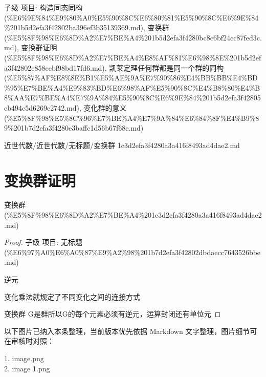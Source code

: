 \begin{note}[变换群]

子级 项目: 构造同态同构 (\%E6\%9E\%84\%E9\%80\%A0\%E5\%90\%8C\%E6\%80\%81\%E5\%90\%8C\%E6\%9E\%84\%201b5d2efa3f42802ba396ef3b35139369.md), 变换群 (\%E5\%8F\%98\%E6\%8D\%A2\%E7\%BE\%A4\%201b5d2efa3f4280bc8c6bf24cc87fed3c.md), 变换群证明 (\%E5\%8F\%98\%E6\%8D\%A2\%E7\%BE\%A4\%E8\%AF\%81\%E6\%98\%8E\%201b5d2efa3f42802e858cebf98bd17fd6.md), 凯莱定理任何群都是同一个群的同构 (\%E5\%87\%AF\%E8\%8E\%B1\%E5\%AE\%9A\%E7\%90\%86\%E4\%BB\%BB\%E4\%BD\%95\%E7\%BE\%A4\%E9\%83\%BD\%E6\%98\%AF\%E5\%90\%8C\%E4\%B8\%80\%E4\%B8\%AA\%E7\%BE\%A4\%E7\%9A\%84\%E5\%90\%8C\%E6\%9E\%84\%201b5d2efa3f42805cb494c5d6269c2742.md), 变化群的意义 (\%E5\%8F\%98\%E5\%8C\%96\%E7\%BE\%A4\%E7\%9A\%84\%E6\%84\%8F\%E4\%B9\%89\%201b7d2efa3f4280e3baffc1d56b67f68e.md)

\end{note}

\begin{note}[来源路径]

近世代数/近世代数/无标题/变换群 1c3d2efa3f4280a3a416f8493ad4dae2.md

\end{note}

\section*{变换群证明}

\begin{note}[来源上级主题]

变换群 (\%E5\%8F\%98\%E6\%8D\%A2\%E7\%BE\%A4\%201c3d2efa3f4280a3a416f8493ad4dae2.md)

\end{note}

\begin{proof}

子级 项目: 无标题 (\%E6\%97\%A0\%E6\%A0\%87\%E9\%A2\%98\%201b7d2efa3f42802dbdaecc7643526bbe.md)

逆元

变化乘法就规定了不同变化之间的连接方式

变换群 G是群所以G的每个元素必须有逆元，运算封闭还有单位元

\end{proof}

\begin{note}[关联图片]
以下图片已纳入本条整理，当前版本优先依据 Markdown 文字整理，图片细节可在审核时对照：

1. image.png\\
2. image 1.png\\

\end{note}

